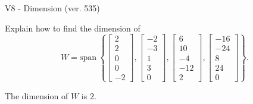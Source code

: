 \begin{exercise}
  \begin{exerciseTitle}V8 - Dimension (ver. 535)\end{exerciseTitle}
  \begin{exerciseStatement}
    Explain how to find the dimension of 
\[W=\mathrm{span}\ \left\{\left[\begin{array}{r}
2 \\
2 \\
0 \\
0 \\
-2
\end{array}\right] , \left[\begin{array}{r}
-2 \\
-3 \\
1 \\
3 \\
0
\end{array}\right] , \left[\begin{array}{r}
6 \\
10 \\
-4 \\
-12 \\
2
\end{array}\right] , \left[\begin{array}{r}
-16 \\
-24 \\
8 \\
24 \\
0
\end{array}\right]\right\}.\]



  \end{exerciseStatement}
  \begin{exerciseAnswer}
   The dimension of \(W\) is  \(2\).
  


  \end{exerciseAnswer}
\end{exercise}